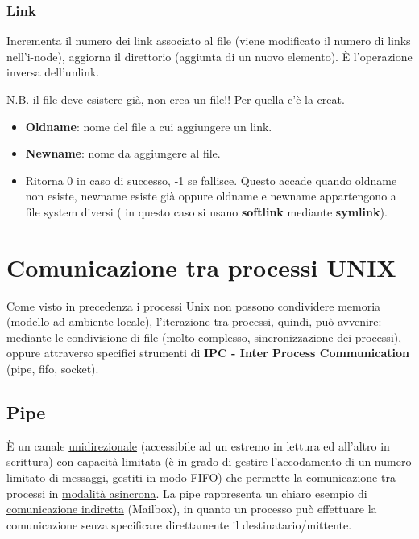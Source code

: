 \documentclass{article}
\begin{document}
\subsubsection{Link}
\noindent {} 
\medskip

\noindent Incrementa il numero dei link associato al file
 (viene modificato il numero di links nell'i-node), aggiorna il 
 direttorio (aggiunta di un nuovo elemento). È l'operazione 
 inversa dell'unlink.
 
 \noindent N.B. il file deve esistere già, non crea un file!! 
 Per quella c'è la creat.

\begin{itemize}
    \item \textbf{Oldname}: nome del file a cui aggiungere un link.
    \item \textbf{Newname}: nome da aggiungere al file.
    \item Ritorna 0 in caso di successo, -1 se fallisce. 
    Questo accade quando oldname non esiste,
     newname esiste già oppure oldname e newname 
     appartengono a file system diversi ( in questo caso 
     si usano \textbf{softlink} mediante \textbf{symlink}).
\end{itemize}

\pagebreak

\section{Comunicazione tra processi UNIX}
\noindent Come visto in precedenza i processi Unix non 
possono condividere memoria (modello ad ambiente locale),
l'iterazione tra processi, quindi, può avvenire:
 mediante le condivisione di file (molto complesso,
sincronizzazione dei processi), oppure attraverso specifici
strumenti di \textbf{IPC - Inter Process Communication}
(pipe, fifo, socket).

\subsection{Pipe}
È un canale \underline{unidirezionale} (accessibile ad
un estremo in lettura ed all'altro in scrittura) con \underline{capacità
limitata} (è in grado di gestire l'accodamento di un numero
limitato di messaggi, gestiti in modo \underline{FIFO})
che permette la comunicazione tra processi in \underline{modalità asincrona}.
La pipe rappresenta un chiaro esempio di \underline{comunicazione 
indiretta} (Mailbox), in quanto un processo può effettuare 
la comunicazione senza specificare direttamente il destinatario/mittente.
\end{document}
